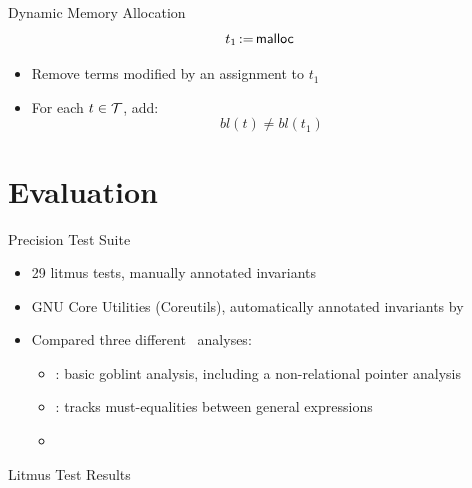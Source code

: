\documentclass[aspectratio=169]{beamer}
\begin{document}
\begin{frame}{Dynamic Memory Allocation}
    \[
        t_1\,{:=}\,\textsf{malloc}
    \]
    \begin{itemize}
        \pause
        \item Remove terms modified by an assignment to $t_1$
\pause
        \item For each $t \in \mathcal{T}$, add:
              \[
                  bl(t) \neq bl(t_1)
              \]
    \end{itemize}
\end{frame}

\section{Evaluation}

\begin{frame}{Precision Test Suite}
    \begin{itemize}
        \item 29 litmus tests, manually annotated invariants
        \pause
        \item GNU Core Utilities (Coreutils), automatically annotated invariants by \cpo\
        \pause
        \item Compared three different \goblint\ analyses:
              \begin{itemize}
                  \item \base{}: basic goblint analysis, including a non-relational pointer analysis
                  \item \vareq{}: tracks must-equalities between general expressions
                  \item \cpo\
              \end{itemize}
    \end{itemize}
\end{frame}


\begin{frame}{Litmus Test Results}
    \centering


\end{frame}
\end{document}
